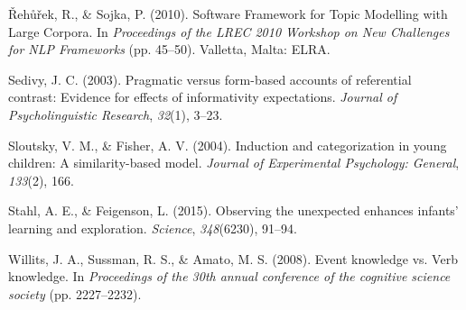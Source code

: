 \documentclass[10pt, letterpaper]{article}
\begin{document}
\leavevmode\hypertarget{ref-rehurek2010}{}%
Řehůřek, R., \& Sojka, P. (2010). Software Framework for Topic Modelling
with Large Corpora. In \emph{Proceedings of the LREC 2010 Workshop on
New Challenges for NLP Frameworks} (pp. 45--50). Valletta, Malta: ELRA.

\leavevmode\hypertarget{ref-sedivy2003}{}%
Sedivy, J. C. (2003). Pragmatic versus form-based accounts of
referential contrast: Evidence for effects of informativity
expectations. \emph{Journal of Psycholinguistic Research}, \emph{32}(1),
3--23.

\leavevmode\hypertarget{ref-sloutsky2004}{}%
Sloutsky, V. M., \& Fisher, A. V. (2004). Induction and categorization
in young children: A similarity-based model. \emph{Journal of
Experimental Psychology: General}, \emph{133}(2), 166.

\leavevmode\hypertarget{ref-stahl2015}{}%
Stahl, A. E., \& Feigenson, L. (2015). Observing the unexpected enhances
infants' learning and exploration. \emph{Science}, \emph{348}(6230),
91--94.

\leavevmode\hypertarget{ref-willits2008}{}%
Willits, J. A., Sussman, R. S., \& Amato, M. S. (2008). Event knowledge
vs. Verb knowledge. In \emph{Proceedings of the 30th annual conference
of the cognitive science society} (pp. 2227--2232).


\end{document}
